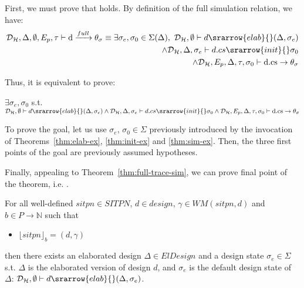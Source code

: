 \documentclass[dvipsnames,12pt]{article}
\begin{document}
\begin{niproof}
  \noindent{}First, we must prove that
  holds.  By definition of the \hvhdl{} full simulation relation, we
  have:
  \begin{equation}
    \begin{split}
      \mathcal{D}_\mathcal{H},\Delta,\emptyset,E_p,\tau\vdash{}\mathrm{d}\xrightarrow{full}\theta_\sigma\equiv
      \exists\sigma_e,\sigma_0\in\Sigma(\Delta),~\mathcal{D}_\mathcal{H},\emptyset\vdash{}d\srarrow{elab}{\fontsize{6}{8}\selectfont}(\Delta,\sigma_{e})\\
      \land\mathcal{D}_\mathcal{H},\Delta,\sigma_{e}\vdash{}d.cs\srarrow{init}{\fontsize{6}{8}\selectfont}\sigma_0\\
      \land\mathcal{D}_\mathcal{H},E_p,\Delta,\tau,\sigma_0\vdash{}\mathrm{d.cs}\rightarrow\theta_\sigma
    \end{split}
  \label{eq:full-sim}
  \end{equation}
  
  Thus, it is equivalent to prove:
  \begin{frameb}
    $\exists\sigma_e,\sigma_0$
    s.t.
    $\mathcal{D}_\mathcal{H},\emptyset\vdash{}d\srarrow{elab}{\fontsize{6}{8}\selectfont}(\Delta,\sigma_{e})
    \land\mathcal{D}_\mathcal{H},\Delta,\sigma_{e}\vdash{}d.cs\srarrow{init}{\fontsize{6}{8}\selectfont}\sigma_0
    \land\mathcal{D}_\mathcal{H},E_p,\Delta,\tau,\sigma_0\vdash{}\mathrm{d.cs}\rightarrow\theta_\sigma$
  \end{frameb}

  To prove the goal, let us use $\sigma_e$, $\sigma_0\in\Sigma$
  previously introduced by the invocation of
  Theorems~\ref{thm:elab-ex}, \ref{thm:init-ex} and \ref{thm:sim-ex}.
  Then, the three first points of the goal are previously assumed
  hypotheses.

  Finally, appealing to Theorem~\ref{thm:full-trace-sim}, we can prove
  final point of the theorem, i.e. .

\end{niproof}

\begin{thm}[Elaboration]
  \label{thm:elab-ex}
  For all well-defined $sitpn\in{}SITPN$, $d\in{}design$,
  $\gamma\in{}WM(sitpn,d)$ and $b\in{}P\rightarrow\mathbb{N}$ such
  that
  \begin{itemize}
  \item $\lfloor{}sitpn\rfloor_b=(d,\gamma)$
  \end{itemize}
  \noindent{}then there exists an elaborated design
  $\Delta\in{}ElDesign$ and a design state $\sigma_e\in\Sigma$ s.t.
  $\Delta$ is the elaborated version of design $d$, and $\sigma_e$ is
  the default design state of $\Delta$:
  $\mathcal{D}_\mathcal{H},\emptyset\vdash{}d\srarrow{elab}{\fontsize{6}{8}\selectfont}(\Delta,\sigma_{e})$.
\end{thm}
\end{document}
